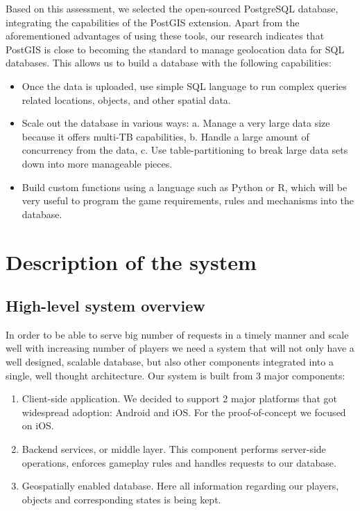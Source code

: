 \documentclass[conference]{IEEEtran}
\begin{document}
Based on this assessment, we selected the open-sourced PostgreSQL database, integrating the capabilities of the PostGIS extension. Apart from the aforementioned advantages of using these tools, our research indicates that PostGIS is close to becoming the standard to manage geolocation data for SQL databases.  This allows us to build a database with the following capabilities:

\begin{itemize}
\item	Once the data is uploaded, use simple SQL language to run complex queries related locations, objects, and other spatial data. 
\item Scale out the database in various ways: a. Manage a very large data size because it offers multi-TB capabilities, b. Handle a large amount of concurrency from the data, c. Use table-partitioning to break large data sets down into more manageable pieces.
\item Build custom functions using a language such as Python or R, which will be very useful to program the game requirements, rules and mechanisms into the database. 
\end{itemize}

\section{Description of the system}

\subsection{High-level system overview}
In order to be able to serve big number of requests in a timely manner and scale well with increasing number of players we need a system that will not only have a well designed, scalable database, but also other components integrated into a single, well thought architecture. Our system is built from 3 major components:

\begin{enumerate}
  \item Client-side application. We decided to support 2 major platforms that got widespread adoption: Android and iOS. For the proof-of-concept we focused on iOS. 
  \item Backend services, or middle layer. This component performs server-side operations, enforces gameplay rules and handles requests to our database. 
  \item Geospatially enabled database. Here all information regarding our players, objects and corresponding states is being kept. 
\end{enumerate}
\end{document}
